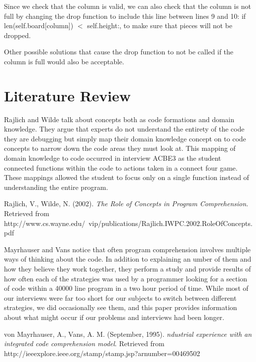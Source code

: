 \documentclass{article}
\begin{document}
Since we check that the column is valid, we can also check that the column is not full by changing the drop function to include this line between lines 9 and 10: if len(self.board[column]) $<$ self.height:, to make sure that pieces will not be dropped.

Other possible solutions that cause the drop function to not be called if the column is full would also be acceptable.

\newpage
\section{Literature Review}



Rajlich and Wilde talk about concepts both as code formations and domain knowledge. They argue that experts do not understand the entirety of the code they are debugging but simply map their domain knowledge concept on to code concepts to narrow down the code areas they must look at. This mapping of domain knowledge to code occurred in interview ACBE3 as the student connected functions within the code to actions taken in a connect four game. These mappings allowed the student to focus only on a single function instead of understanding the entire program.

Rajlich, V., Wilde, N. (2002). \textit{The Role of Concepts in Program Comprehension}. Retrieved from http://www.cs.wayne.edu/~vip/publications/Rajlich.IWPC.2002.RoleOfConcepts.pdf

Mayrhauser and Vans notice that often program comprehension involves multiple ways of thinking about the code. In addition to explaining an umber of them and how they believe they work together, they perform a study and provide results of how often each of the strategies was used by a programmer looking for a section of code within a 40000 line program in a two hour period of time. While most of our interviews were far too short for our subjects to switch between different strategies, we did occasionally see them, and this paper provides information about what might occur if our problems and interviews had been longer. 

von Mayrhauser, A., Vans, A. M. (September, 1995). \textit{ndustrial experience with an integrated code comprehension model}. Retrieved from http://ieeexplore.ieee.org/stamp/stamp.jsp?arnumber=00469502

\newpage
\end{document}
